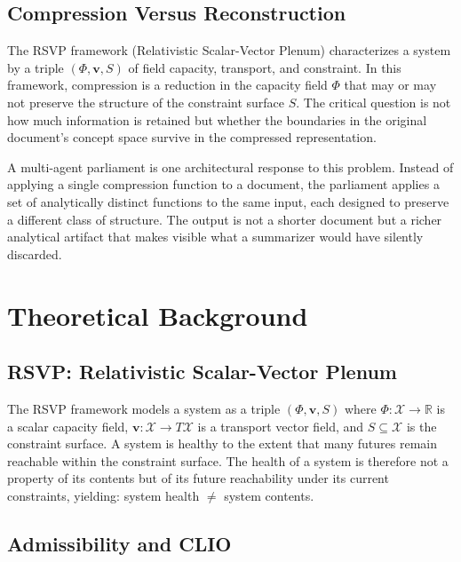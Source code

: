 \documentclass[12pt, a4paper]{article}
\theoremstyle{principle}
\theoremstyle{definition}
\begin{document}
\subsection{Compression Versus Reconstruction}

The RSVP framework (Relativistic Scalar-Vector Plenum) characterizes a system by a
triple $(\Phi, \mathbf{v}, S)$ of field capacity, transport, and constraint. In this
framework, compression is a reduction in the capacity field $\Phi$ that may or may
not preserve the structure of the constraint surface $S$. The critical question is
not how much information is retained but whether the boundaries in the original
document's concept space survive in the compressed representation.

A multi-agent parliament is one architectural response to this problem. Instead of
applying a single compression function to a document, the parliament applies a set of
analytically distinct functions to the same input, each designed to preserve a
different class of structure. The output is not a shorter document but a richer
analytical artifact that makes visible what a summarizer would have silently discarded.

\section{Theoretical Background}

\subsection{RSVP: Relativistic Scalar-Vector Plenum}

The RSVP framework models a system as a triple $(\Phi, \mathbf{v}, S)$ where
$\Phi : \mathcal{X} \to \mathbb{R}$ is a scalar capacity field,
$\mathbf{v} : \mathcal{X} \to T\mathcal{X}$ is a transport vector field, and
$S \subseteq \mathcal{X}$ is the constraint surface. A system is healthy to the
extent that many futures remain reachable within the constraint surface. The
health of a system is therefore not a property of its contents but of its future
reachability under its current constraints, yielding: system health $\neq$ system
contents.

\subsection{Admissibility and CLIO}
\end{document}

